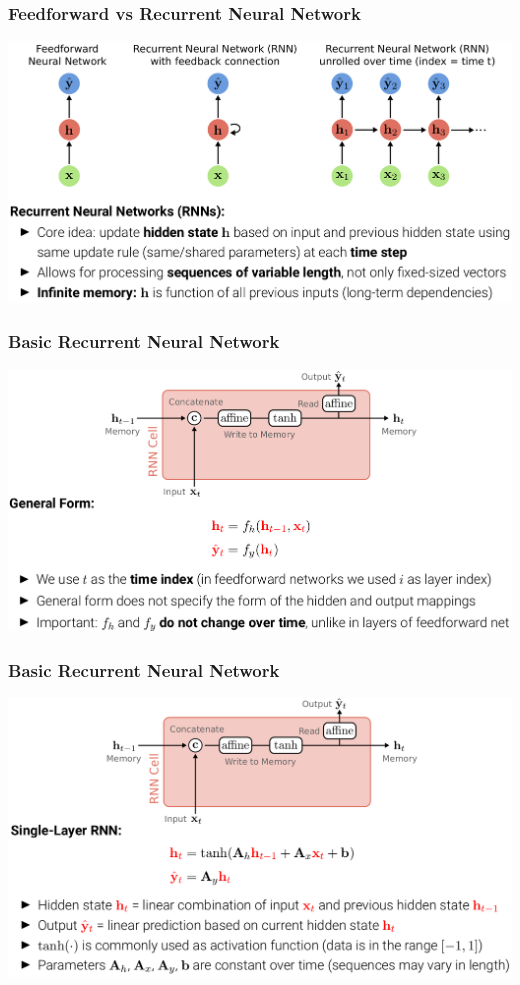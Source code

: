 \documentclass[10pt]{beamer}
\begin{document}
\begin{frame}
  \frametitle{Feedforward vs Recurrent Neural Network}
\begin{center}
\includegraphics[width=.9\textwidth]{images/s2}
\end{center}
\end{frame}


\begin{frame}
  \frametitle{Basic Recurrent Neural Network}
\begin{center}
\includegraphics[width=.9\textwidth]{images/s3}
\end{center}
\end{frame}


\begin{frame}
  \frametitle{Basic Recurrent Neural Network}
\begin{center}
\includegraphics[width=.9\textwidth]{images/s4}
\end{center}
\end{frame}
\end{document}
